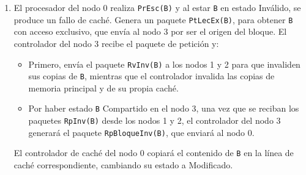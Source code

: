 \begin{ejercicio}
\begin{enumerate}
\begin{enumerate}
        \item El procesador del nodo 0 realiza \verb|PrEsc(B)| y al estar \verb|B| en estado Inválido, se produce un fallo de caché. Genera un paquete \verb|PtLecEx(B)|, para obtener \verb|B| con acceso exclusivo, que envía al nodo 3 por ser el origen del bloque. El controlador del nodo 3 recibe el paquete de petición y:
            \begin{itemize}
                \item Primero, envía el paquete \verb|RvInv(B)| a los nodos 1 y 2 para que invaliden sus copias de \verb|B|, mientras que el controlador invalida las copias de memoria principal y de su propia caché.
                \item Por haber estado \verb|B| Compartido en el nodo 3, una vez que se reciban los paquetes \verb|RpInv(B)| desde los nodos 1 y 2, el controlador del nodo 3 generará el paquete \verb|RpBloqueInv(B)|, que enviará al nodo 0.
            \end{itemize}

            El controlador de caché del nodo 0 copiará el contenido de \verb|B| en la línea de caché correspondiente, cambiando su estado a Modificado.
    \end{enumerate}

\end{enumerate}

\end{ejercicio}

